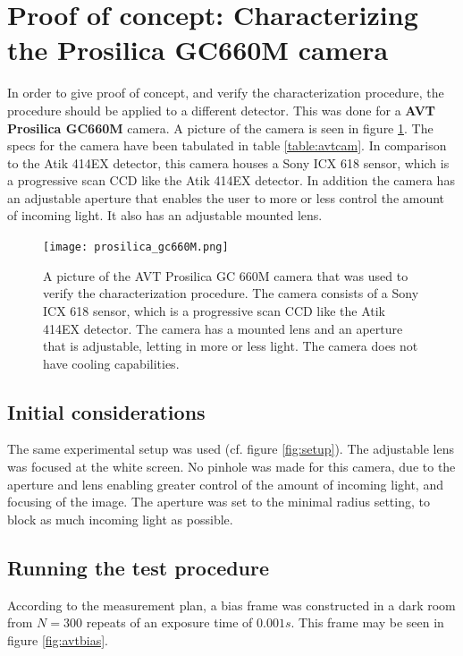\documentclass[../main.tex]{subfiles}
\begin{document}
		
		\section{Proof of concept: Characterizing the Prosilica GC660M camera}\label{sec:avtchar}
		In order to give proof of concept, and verify the characterization procedure, the procedure should be applied to a different detector. This was done for a \textbf{AVT Prosilica GC660M} camera. A picture of the camera is seen in figure \ref{fig:avtcam}. The specs for the camera have been tabulated in table \ref{table:avtcam}. In comparison to the Atik 414EX detector, this camera houses a Sony ICX 618 sensor, which is a progressive scan CCD like the Atik 414EX detector. In addition the camera has an adjustable aperture that enables the user to more or less control the amount of incoming light. It also has an adjustable mounted lens. 
		
		\begin{figure}[hbt!]
			\centering			\texttt{[image: prosilica\_gc660M.png]}
			\caption{A picture \cite{avtcamspecs} of the AVT Prosilica GC 660M camera that was used to verify the characterization procedure. The camera consists of a Sony ICX 618 sensor, which is a progressive scan CCD like the Atik 414EX detector. The camera has a mounted lens and an aperture that is adjustable, letting in more or less light. The camera does not have cooling capabilities.}
			\label{fig:avtcam}
		\end{figure}
		
		\subsection{Initial considerations}
		The same experimental setup was used (cf. figure \ref{fig:setup}). The adjustable lens was focused at the white screen. No pinhole was made for this camera, due to the aperture and lens enabling greater control of the amount of incoming light, and focusing of the image. The aperture was set to the minimal radius setting, to block as much incoming light as possible.
		
		\subsection{Running the test procedure}
		According to the measurement plan, a bias frame was constructed in a dark room from $N=300$ repeats of an exposure time of $0.001s$. This frame may be seen in figure \ref{fig:avtbias}.
		
\end{document}
